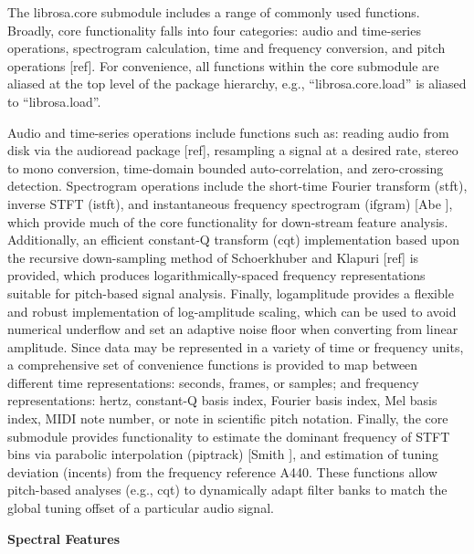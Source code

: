 The librosa.core submodule includes a range of commonly used functions. Broadly, core functionality falls into four categories: audio and time-series operations, spectrogram calculation, time and frequency conversion, and pitch operations [ref]. For convenience, all functions within the core submodule are aliased at the top level of the package hierarchy, e.g., ``librosa.core.load'' is aliased to ``librosa.load''.
\par
Audio and time-series operations include functions such as: reading audio from disk via the audioread package [ref], resampling a signal at a desired rate, stereo to mono conversion, time-domain bounded auto-correlation, and zero-crossing detection. Spectrogram operations include the short-time Fourier transform (stft), inverse STFT (istft), and instantaneous frequency spectrogram (ifgram) [Abe ], which provide much of the core functionality for down-stream feature analysis. Additionally, an efficient constant-Q transform (cqt) implementation based upon the recursive down-sampling method of Schoerkhuber and Klapuri [ref] is provided, which produces logarithmically-spaced frequency representations suitable for pitch-based signal analysis. Finally, logamplitude provides a flexible and robust implementation of log-amplitude scaling, which can be used to avoid numerical underflow and set an adaptive noise floor when converting from linear amplitude. Since data may be represented in a variety of time or frequency units, a comprehensive set of convenience functions is provided to map between different time representations: seconds, frames, or samples; and frequency representations: hertz, constant-Q basis index, Fourier basis index, Mel basis index, MIDI note number, or note in scientific pitch notation. Finally, the core submodule provides functionality to estimate the dominant frequency of STFT bins via parabolic interpolation (piptrack) [Smith ], and estimation of tuning deviation (incents) from the frequency reference A440. These functions allow pitch-based analyses (e.g., cqt) to dynamically adapt filter banks to match the global tuning offset of a particular audio signal.

\par
\begin{flushleft}
  \textbf{Spectral Features}
\end{flushleft}


